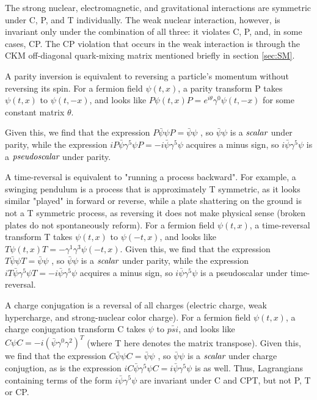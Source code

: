 The strong nuclear, electromagnetic, and gravitational interactions are symmetric under C, P, and T individually. The weak nuclear interaction, however, is invariant only under the combination of all three: it violates C, P, and, in some cases, CP. The CP violation that occurs in the weak interaction is through the CKM off-diagonal quark-mixing matrix mentioned briefly in section \ref{sec:SM}.

A parity inversion is equivalent to reversing a particle's momentum without reversing its spin. For a fermion field $\psi(t,x)$, a parity transform P takes $\psi(t,x)$ to $\psi(t,-x)$, and looks like $P \psi(t,x) P = e^{i \theta} \gamma^{0} \psi(t,-x)$ for some constant matrix $\theta$. 

Given this, we find that the expression $P \bar{\psi}\psi P = \bar{\psi}\psi$ , so $\bar{\psi}\psi$ is a $\emph{scalar}$ under parity, while the expression $iP \bar{\psi}\gamma^{5}\psi P = -i\bar{\psi}\gamma^{5}\psi$ acquires a minus sign, so $i\bar{\psi}\gamma^{5}\psi$ is a $\emph{pseudoscalar}$ under parity.

A time-reversal is equivalent to "running a process backward". For example, a swinging pendulum is a process that is approximately T symmetric, as it looks similar "played" in forward or reverse, while a plate shattering on the ground is not a T symmetric process, as reversing it does not make physical sense (broken plates do not spontaneously reform). For a fermion field $\psi(t,x)$, a time-reversal transform T takes $\psi(t,x)$ to $\psi(-t,x)$, and looks like $T \psi(t,x) T = -\gamma^{1}\gamma^{3} \psi(-t,x)$. Given this, we find that the expression $T \bar{\psi}\psi T = \bar{\psi}\psi$ , so $\bar{\psi}\psi$ is a $\emph{scalar}$ under parity, while the expression $iT \bar{\psi}\gamma^{5}\psi T = -i\bar{\psi}\gamma^{5}\psi$ acquires a minus sign, so $i\bar{\psi}\gamma^{5}\psi$ is a pseudoscalar under time-reversal.

A charge conjugation is a reversal of all charges (electric charge, weak hypercharge, and strong-nuclear color charge). For a fermion field $\psi(t,x)$, a charge conjugation transform C takes $\psi$ to $\bar{psi}$, and looks like $C \psi C = -i (\bar{\psi} \gamma^{0} \gamma^{2})^{T}$ (where T here denotes the matrix transpose). Given this, we find that the expression $C \bar{\psi}\psi C = \bar{\psi}\psi$ , so $\bar{\psi}\psi$ is a $\emph{scalar}$ under charge conjugtion, as is the expression $iC \bar{\psi}\gamma^{5}\psi C = i\bar{\psi}\gamma^{5}\psi$ is as well. Thus, Lagrangians containing terms of the form $i\bar{\psi}\gamma^{5}\psi$ are invariant under C and CPT, but not P, T or CP.

